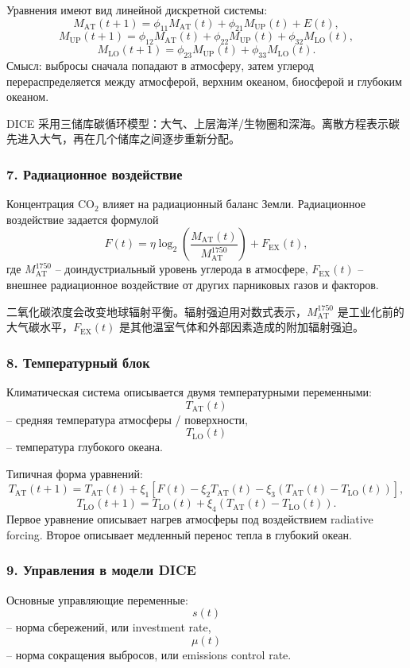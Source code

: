 \documentclass[12pt,a4paper]{article}
\newcommand{\zh}[1]{\par\noindent #1\par}
\begin{document}
Уравнения имеют вид линейной дискретной системы:
\[
M_{\mathrm{AT}}(t+1)=\phi_{11}M_{\mathrm{AT}}(t)+\phi_{21}M_{\mathrm{UP}}(t)+E(t),
\]
\[
M_{\mathrm{UP}}(t+1)=\phi_{12}M_{\mathrm{AT}}(t)+\phi_{22}M_{\mathrm{UP}}(t)+\phi_{32}M_{\mathrm{LO}}(t),
\]
\[
M_{\mathrm{LO}}(t+1)=\phi_{23}M_{\mathrm{UP}}(t)+\phi_{33}M_{\mathrm{LO}}(t).
\]
Смысл: выбросы сначала попадают в атмосферу, затем углерод перераспределяется между атмосферой, верхним океаном, биосферой и глубоким океаном.
\zh{DICE 采用三储库碳循环模型：大气、上层海洋/生物圈和深海。离散方程表示碳先进入大气，再在几个储库之间逐步重新分配。}

\subsubsection*{7. Радиационное воздействие}
Концентрация CO$_2$ влияет на радиационный баланс Земли. Радиационное воздействие задается формулой
\[
F(t)=\eta\log_2\left(\frac{M_{\mathrm{AT}}(t)}{M_{\mathrm{AT}}^{1750}}\right)+F_{\mathrm{EX}}(t),
\]
где $M_{\mathrm{AT}}^{1750}$ -- доиндустриальный уровень углерода в атмосфере, $F_{\mathrm{EX}}(t)$ -- внешнее радиационное воздействие от других парниковых газов и факторов.
\zh{二氧化碳浓度会改变地球辐射平衡。辐射强迫用对数式表示，\(M_{\mathrm{AT}}^{1750}\) 是工业化前的大气碳水平，\(F_{\mathrm{EX}}(t)\) 是其他温室气体和外部因素造成的附加辐射强迫。}

\subsubsection*{8. Температурный блок}
Климатическая система описывается двумя температурными переменными:
\[
T_{\mathrm{AT}}(t)
\]
-- средняя температура атмосферы / поверхности,
\[
T_{\mathrm{LO}}(t)
\]
-- температура глубокого океана.

Типичная форма уравнений:
\[
T_{\mathrm{AT}}(t+1)=T_{\mathrm{AT}}(t)+\xi_1\left[F(t)-\xi_2T_{\mathrm{AT}}(t)-\xi_3(T_{\mathrm{AT}}(t)-T_{\mathrm{LO}}(t))\right],
\]
\[
T_{\mathrm{LO}}(t+1)=T_{\mathrm{LO}}(t)+\xi_4(T_{\mathrm{AT}}(t)-T_{\mathrm{LO}}(t)).
\]
Первое уравнение описывает нагрев атмосферы под воздействием radiative forcing. Второе описывает медленный перенос тепла в глубокий океан.

\subsubsection*{9. Управления в модели DICE}
Основные управляющие переменные:
\[
s(t)
\]
-- норма сбережений, или investment rate,
\[
\mu(t)
\]
-- норма сокращения выбросов, или emissions control rate.
\end{document}
